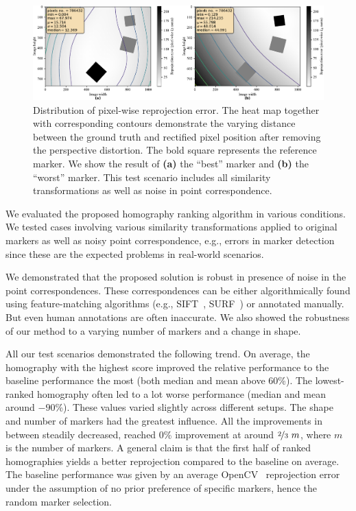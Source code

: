 \begin{figure}[t]
    \centerline{\includegraphics[width=\linewidth]{figures/methodology/heatmaps_best_worst.pdf}}
    \caption[Homography ranking heatmaps]{Distribution of pixel-wise reprojection error. The heat map together with corresponding contours demonstrate the varying distance between the ground truth and rectified pixel position after removing the perspective distortion. The bold square represents the reference marker. We show the result of \textbf{(a)} the ``best'' marker and \textbf{(b)} the ``worst'' marker. This test scenario includes all similarity transformations as well as noise in point correspondence.}
    \label{fig:HeatmapsBestWorst}
\end{figure}

We evaluated the proposed homography ranking algorithm in various conditions. We tested cases involving various similarity transformations applied to original markers as well as noisy point correspondence, e.g., errors in marker detection since these are the expected problems in real-world scenarios.

We demonstrated that the proposed solution is robust in presence of noise in the point correspondences. These correspondences can be either algorithmically found using feature-matching algorithms (e.g., SIFT~\cite{lowe1999object}, SURF~\cite{bay2008speeded}) or annotated manually. But even human annotations are often inaccurate. We also showed the robustness of our method to a varying number of markers and a change in shape.

All our test scenarios demonstrated the following trend. On average, the homography with the highest score improved the relative performance to the baseline performance the most (both median and mean above $60$\%). The lowest-ranked homography often led to a lot worse performance (median and mean around $-90$\%). These values varied slightly across different setups. The shape and number of markers had the greatest influence. All the improvements in between steadily decreased, reached $0$\% improvement at around $\nicefrac{2}{3}~m$, where $m$ is the number of markers. A general claim is that the first half of ranked homographies yields a better reprojection compared to the baseline on average. The baseline performance was given by an average OpenCV~\cite{bradski2008learning} reprojection error under the assumption of no prior preference of specific markers, hence the random marker selection.
